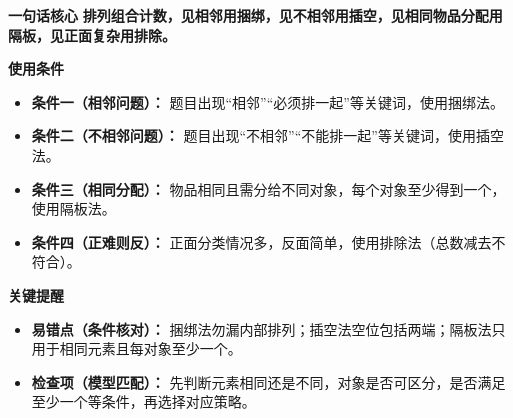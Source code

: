 \begin{summarybox}
	\textbf{\textcolor{CSummary}{一句话核心}}
	\textbf{排列组合计数，见相邻用捆绑，见不相邻用插空，见相同物品分配用隔板，见正面复杂用排除。}

	\medskip
	\textbf{\textcolor{CSummary}{使用条件}}
	\begin{itemize}[leftmargin=*, itemsep=0.5em, topsep=0.4em]
		\item \textbf{条件一（相邻问题）：} 题目出现“相邻”“必须排一起”等关键词，使用捆绑法。
		\item \textbf{条件二（不相邻问题）：} 题目出现“不相邻”“不能排一起”等关键词，使用插空法。
		\item \textbf{条件三（相同分配）：} 物品相同且需分给不同对象，每个对象至少得到一个，使用隔板法。
		\item \textbf{条件四（正难则反）：} 正面分类情况多，反面简单，使用排除法（总数减去不符合）。
	\end{itemize}

	\medskip
	\textbf{\textcolor{CSummary}{关键提醒}}
	\begin{itemize}[leftmargin=*, itemsep=0.5em, topsep=0.4em]
		\item \textbf{易错点（条件核对）：} 捆绑法勿漏内部排列；插空法空位包括两端；隔板法只用于相同元素且每对象至少一个。
		\item \textbf{检查项（模型匹配）：} 先判断元素相同还是不同，对象是否可区分，是否满足至少一个等条件，再选择对应策略。
	\end{itemize}

\end{summarybox}
